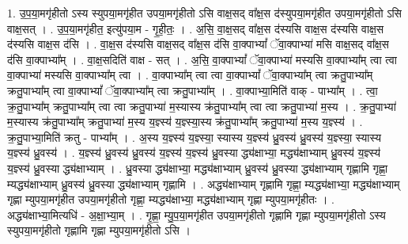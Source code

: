 \documentclass[17pt]{extarticle}
\begin{document}
1. उ॒प॒या॒मगृ॑हीतो ऽस्य स्युपया॒मगृ॑हीत उपया॒मगृ॑हीतो ऽसि वाक्ष॒सद् वा᳚क्ष॒स द॑स्युपया॒मगृ॑हीत उपया॒मगृ॑हीतो ऽसि वाक्ष॒सत् । . उ॒प॒या॒मगृ॑हीत॒ इत्यु॑पया॒म - गृ॒ही॒तः॒ । . अ॒सि॒ वा॒क्ष॒सद् वा᳚क्ष॒स द॑स्यसि वाक्ष॒स द॑स्यसि वाक्ष॒स द॑स्यसि वाक्ष॒स द॑सि । . वा॒क्ष॒स द॑स्यसि वाक्ष॒सद् वा᳚क्ष॒स द॑सि वा॒क्पाभ्यां᳚ ॅवा॒क्पाभ्या॑ मसि वाक्ष॒सद् वा᳚क्ष॒स द॑सि वा॒क्पाभ्या᳚म् । . वा॒क्ष॒सदिति॑ वाक्ष - सत् । . अ॒सि॒ वा॒क्पाभ्यां᳚ ॅवा॒क्पाभ्या॑ मस्यसि वा॒क्पाभ्या᳚म् त्वा त्वा वा॒क्पाभ्या॑ मस्यसि वा॒क्पाभ्या᳚म् त्वा । . वा॒क्पाभ्या᳚म् त्वा त्वा वा॒क्पाभ्यां᳚ ॅवा॒क्पाभ्या᳚म् त्वा क्रतु॒पाभ्या᳚म् क्रतु॒पाभ्या᳚म् त्वा वा॒क्पाभ्यां᳚ ॅवा॒क्पाभ्या᳚म् त्वा क्रतु॒पाभ्या᳚म् । . वा॒क्पाभ्या॒मिति॑ वाक् - पाभ्या᳚म् । . त्वा॒ क्र॒तु॒पाभ्या᳚म् क्रतु॒पाभ्या᳚म् त्वा त्वा क्रतु॒पाभ्या॑ म॒स्यास्य क्र॑तु॒पाभ्या᳚म् त्वा त्वा क्रतु॒पाभ्या॑ म॒स्य । . क्र॒तु॒पाभ्या॑ म॒स्यास्य क्र॑तु॒पाभ्या᳚म् क्रतु॒पाभ्या॑ म॒स्य य॒ज्ञ्स्य॑ य॒ज्ञ्स्या॒स्य क्र॑तु॒पाभ्या᳚म् क्रतु॒पाभ्या॑ म॒स्य य॒ज्ञ्स्य॑ । . क्र॒तु॒पाभ्या॒मिति॑ क्रतु - पाभ्या᳚म् । . अ॒स्य य॒ज्ञ्स्य॑ य॒ज्ञ्स्या॒ स्यास्य य॒ज्ञ्स्य॑ ध्रु॒वस्य॑ ध्रु॒वस्य॑ य॒ज्ञ्स्या॒ स्यास्य य॒ज्ञ्स्य॑ ध्रु॒वस्य॑ । . य॒ज्ञ्स्य॑ ध्रु॒वस्य॑ ध्रु॒वस्य॑ य॒ज्ञ्स्य॑ य॒ज्ञ्स्य॑ ध्रु॒वस्या द्ध्य॑क्षाभ्या॒ मद्ध्य॑क्षाभ्याम् ध्रु॒वस्य॑ य॒ज्ञ्स्य॑ य॒ज्ञ्स्य॑ ध्रु॒वस्या द्ध्य॑क्षाभ्याम् । . ध्रु॒वस्या द्ध्य॑क्षाभ्या॒ मद्ध्य॑क्षाभ्याम् ध्रु॒वस्य॑ ध्रु॒वस्या द्ध्य॑क्षाभ्याम् गृह्णामि गृह्णा॒ म्यद्ध्य॑क्षाभ्याम् ध्रु॒वस्य॑ ध्रु॒वस्या द्ध्य॑क्षाभ्याम् गृह्णामि । . अद्ध्य॑क्षाभ्याम् गृह्णामि गृह्णा॒ म्यद्ध्य॑क्षाभ्या॒ मद्ध्य॑क्षाभ्याम् गृह्णा म्युपया॒मगृ॑हीत उपया॒मगृ॑हीतो गृह्णा॒ म्यद्ध्य॑क्षाभ्या॒ मद्ध्य॑क्षाभ्याम् गृह्णा म्युपया॒मगृ॑हीतः । . अद्ध्य॑क्षाभ्या॒मित्यधि॑ - अ॒क्षा॒भ्या॒म् । . गृ॒ह्णा॒ म्यु॒प॒या॒मगृ॑हीत उपया॒मगृ॑हीतो गृह्णामि गृह्णा म्युपया॒मगृ॑हीतो ऽस्य स्युपया॒मगृ॑हीतो गृह्णामि गृह्णा म्युपया॒मगृ॑हीतो ऽसि । \newline
\end{document}
